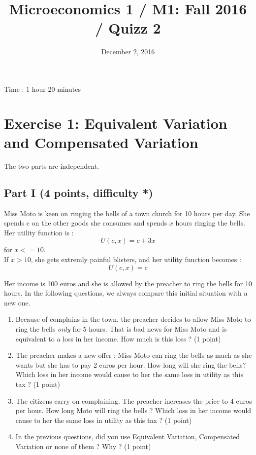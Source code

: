 \documentclass[11pt]{article} %
\title{Microeconomics 1 / M1: Fall 2016 / Quizz 2}
\date{December 2, 2016} %
\begin{document}
\maketitle

Time : 1 hour 20 minutes

\section*{Exercise 1: Equivalent Variation and Compensated Variation}

The two parts are independent.

\subsection*{Part I {\small (4 points, difficulty *)}}
Miss Moto is keen on ringing the bells of a town church for 10 hours per day. She spends c on the other goods she consumes and spends $x$ hours ringing the bells. Her utility function is :
\begin{equation*}
U (c, x) = c + 3x
\end{equation*}  
for $x<=10$.\\

If $x>10$, she gets extremly painful blisters, and her utility function becomes : 
\begin{equation*}
U (c, x) = c 
\end{equation*} 

Her income is 100 euros and she is allowed by the preacher to ring the bells  for 10 hours. In the following questions, we always compare this initial situation with a new one.
\begin{enumerate}
\item Because of complains in the town, the preacher decides to allow Miss Moto to ring the bells \textit{only} for 5 hours. That is bad news for Miss Moto and is equivalent to a loss in her income. How much is this loss ? (1 point)
\item The preacher makes a new offer : Miss Moto can ring the bells as much as she wants but she has to pay 2 euros per hour. How long will she ring the bells? Which loss in her income would cause to her the same loss in utility as this tax ?  (1 point)
\item The citizens carry on complaining. The preacher increases the price to 4 euros per hour. How long Moto will ring the bells ? Which loss in her income would cause to her the same loss in utility as this tax ?  (1 point)
\item In the previous questions, did you use Equivalent Variation, Compensated Variation or none of them ? Why ? (1 point)
\end{enumerate}
\end{document}
